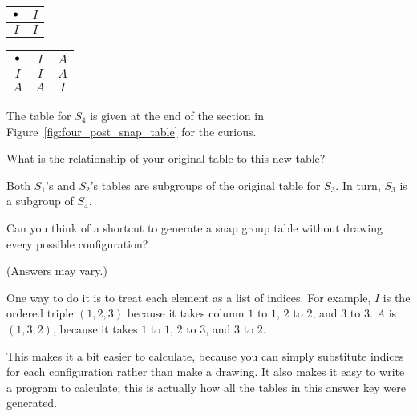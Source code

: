 \documentclass[../gatm_answers.tex]{subfiles}
\begin{document}
\begin{center}
	\begin{minipage}{0.45\textwidth}
		\centering
		\begin{tabular}{c|c}
			\hline
			$\bullet$ & $I$ \\ \hline
			\rowcolor{light-gray}
			$I$ & $I$ \\ \hline
		\end{tabular}
	\end{minipage}
	\hfill
	\begin{minipage}{0.45\textwidth}
		\centering
		\begin{tabular}{c|cc}
			\hline
			$\bullet$ & $I$ & $A$ \\ \hline
			\rowcolor{light-gray}
			$I$ & $I$ & $A$ \\
			$A$ & $A$ & $I$ \\ \hline
		\end{tabular}
	\end{minipage}
\end{center}

\noindent The table for $S_4$ is given at the end of the section in Figure~\ref{fig:four_post_snap_table} for the curious.

\begin{inner_problem}
	\item What is the relationship of your original table to this new table?
\end{inner_problem}

\noindent Both $S_1$'s and $S_2$'s tables are subgroups of the original table for $S_3$. In turn, $S_3$ is a subgroup of $S_4$.

\begin{outer_problem}
	\item Can you think of a shortcut to generate a snap group table without drawing every possible configuration?
\end{outer_problem}

\noindent (Answers may vary.)

One way to do it is to treat each element as a list of indices. For example, $I$ is the ordered triple $(1,2,3)$ because it takes column $1$ to $1$, $2$ to $2$, and $3$ to $3$. $A$ is $(1,3,2)$, because it takes $1$ to $1$, $2$ to $3$, and $3$ to $2$.

This makes it a bit easier to calculate, because you can simply substitute indices for each configuration rather than make a drawing. It also makes it easy to write a program to calculate; this is actually how all the tables in this answer key were generated.
\end{document}

